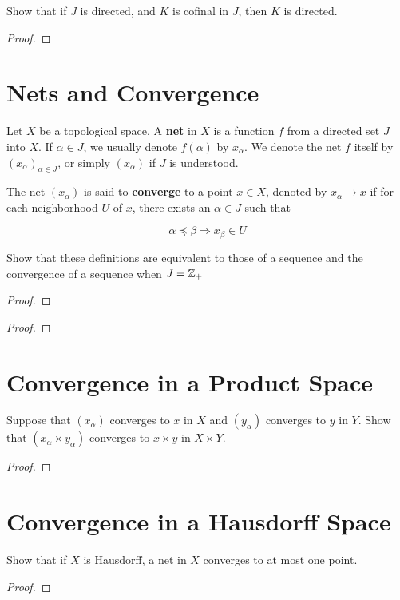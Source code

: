 \documentclass[12pt]{article}
\begin{document}
Show that if $J$ is directed, and $K$ is cofinal in $J$, then $K$ is directed.

\begin{proof}
\end{proof}

\section{Nets and Convergence}
\begin{defn}
    Let $X$ be a topological space. A \textbf{net} in $X$ is a function $f$ from a directed set $J$
    into $X$. If $\alpha \in J$, we usually denote $f(\alpha)$ by $x_\alpha$. We denote the net $f$
    itself by ${\left(x_\alpha\right)}_{\alpha \in J}$, or simply $(x_\alpha)$ if $J$ is
    understood.
\end{defn}
\begin{defn}
    The net $(x_\alpha)$ is said to \textbf{converge} to a point $x \in X$, denoted by $x_\alpha
        \to x$ if for each neighborhood $U$ of $x$, there exists an $\alpha \in J$ such that

    \[\alpha \preceq \beta \Longrightarrow x_\beta \in U\]
\end{defn}

Show that these definitions are equivalent to those of a sequence and the convergence of a sequence
when $J = \mathbb{Z}_+$

\begin{proof}
\end{proof}
\begin{proof}
\end{proof}

\section{Convergence in a Product Space}
Suppose that $(x_\alpha)$ converges to $x$ in $X$ and $(y_\alpha)$ converges to $y$ in $Y$. Show
that $(x_\alpha \times y_\alpha)$ converges to $x \times y$ in $X \times Y$.
\begin{proof}
\end{proof}

\section{Convergence in a Hausdorff Space}
Show that if $X$ is Hausdorff, a net in $X$ converges to at most one point.
\begin{proof}
\end{proof}
\end{document}
